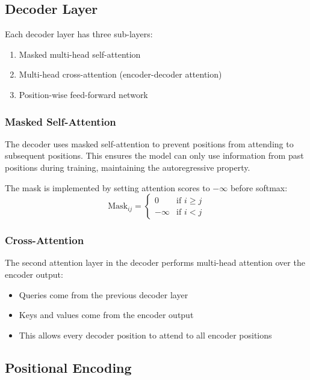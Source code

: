 \subsection{Decoder Layer}

Each decoder layer has three sub-layers:
\begin{enumerate}
    \item Masked multi-head self-attention
    \item Multi-head cross-attention (encoder-decoder attention)
    \item Position-wise feed-forward network
\end{enumerate}

\subsubsection{Masked Self-Attention}

The decoder uses masked self-attention to prevent positions from attending to subsequent positions. This ensures the model can only use information from past positions during training, maintaining the autoregressive property.

The mask is implemented by setting attention scores to $-\infty$ before softmax:
\begin{equation}
\text{Mask}_{ij} = \begin{cases}
0 & \text{if } i \geq j \\
-\infty & \text{if } i < j
\end{cases}
\end{equation}

\subsubsection{Cross-Attention}

The second attention layer in the decoder performs multi-head attention over the encoder output:
\begin{itemize}
    \item Queries come from the previous decoder layer
    \item Keys and values come from the encoder output
    \item This allows every decoder position to attend to all encoder positions
\end{itemize}

\subsection{Positional Encoding}

